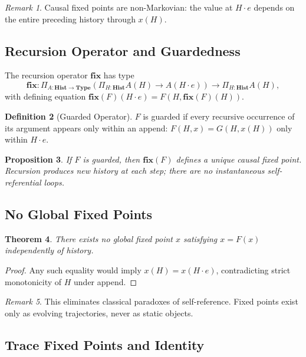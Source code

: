 \documentclass[11pt,a4paper]{article}
\newtheorem{theorem}{Theorem}[section]
\newtheorem{proposition}[theorem]{Proposition}
\theoremstyle{definition}
\newtheorem{definition}[theorem]{Definition}
\theoremstyle{remark}
\newtheorem{remark}[theorem]{Remark}
\begin{document}
\begin{remark}
Causal fixed points are non-Markovian: the value at $H \cdot e$ depends on the entire preceding history through $x(H)$.
\end{remark}

\subsection{Recursion Operator and Guardedness}

The recursion operator $\mathbf{fix}$ has type
\[
\mathbf{fix} : \Pi_{A:\mathbf{Hist}\to\mathbf{Type}} \left(\Pi_{H:\mathbf{Hist}} A(H) \to A(H \cdot e)\right) \to \Pi_{H:\mathbf{Hist}} A(H),
\]
with defining equation $\mathbf{fix}(F)(H \cdot e) = F(H, \mathbf{fix}(F)(H))$.

\begin{definition}[Guarded Operator]
$F$ is guarded if every recursive occurrence of its argument appears only within an append: $F(H,x) = G(H, x(H))$ only within $H \cdot e$.
\end{definition}

\begin{proposition}
If $F$ is guarded, then $\mathbf{fix}(F)$ defines a unique causal fixed point. Recursion produces new history at each step; there are no instantaneous self-referential loops.
\end{proposition}

\subsection{No Global Fixed Points}

\begin{theorem}
There exists no global fixed point $x$ satisfying $x = F(x)$ independently of history.
\end{theorem}

\begin{proof}
Any such equality would imply $x(H) = x(H \cdot e)$, contradicting strict monotonicity of $H$ under append.
\end{proof}

\begin{remark}
This eliminates classical paradoxes of self-reference. Fixed points exist only as evolving trajectories, never as static objects.
\end{remark}

\subsection{Trace Fixed Points and Identity}
\end{document}
